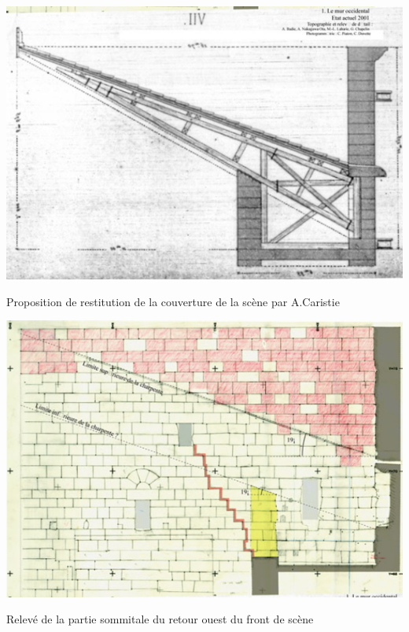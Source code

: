 		
		\begin{figureth}
			\begin{subfigureth}{0.49\textwidth}
				\includegraphics[width=\linewidth]{images/toitCaristie}
				\caption[Couverture de scène proposée par A.Caristie]{Proposition de restitution de la couverture de la scène par A.Caristie}
				\label{toitCaristie}
			\end{subfigureth}	
			\begin{subfigureth}{0.49\textwidth}
				\includegraphics[width=\linewidth]{images/toitBadie}
				\caption[Relevé de la partie sommitale du retour ouest du front de scène]{Relevé de la partie sommitale du retour ouest du front de scène \footnotemark}
				\label{toitBadie}
			\end{subfigureth}
		\end{figureth}
		
